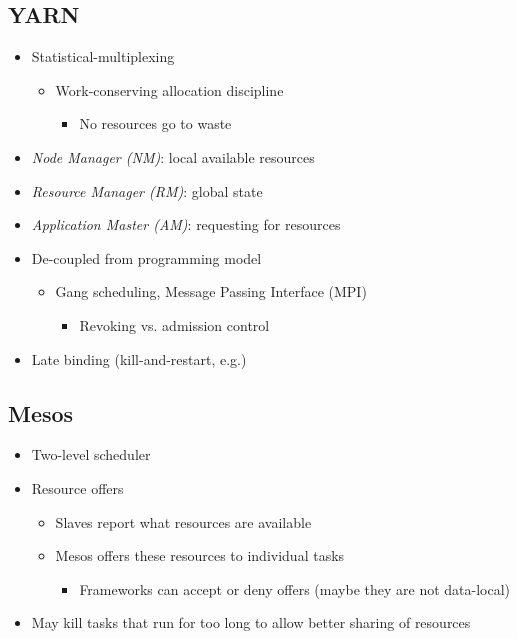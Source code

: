 \documentclass[11pt]{article}
\begin{document}
\subsection{YARN}
\label{sec:orgheadline13}
\begin{itemize}
\item Statistical-multiplexing
\begin{itemize}
\item Work-conserving allocation discipline
\begin{itemize}
\item No resources go to waste
\end{itemize}
\end{itemize}
\item \textit{Node Manager (NM)}: local available resources
\item \textit{Resource Manager (RM)}: global state
\item \textit{Application Master (AM)}: requesting for resources
\item De-coupled from programming model
\begin{itemize}
\item Gang scheduling, Message Passing Interface (MPI)
\begin{itemize}
\item Revoking vs. admission control
\end{itemize}
\end{itemize}
\item Late binding (kill-and-restart, e.g.)
\end{itemize}

\subsection{Mesos}
\label{sec:orgheadline15}
\begin{itemize}
\item Two-level scheduler
\item Resource offers
\begin{itemize}
\item Slaves report what resources are available
\item Mesos offers these resources to individual tasks
\begin{itemize}
\item Frameworks can accept or deny offers (maybe they are not data-local)
\end{itemize}
\end{itemize}
\item May kill tasks that run for too long to allow better sharing of resources
\end{itemize}
\end{document}
